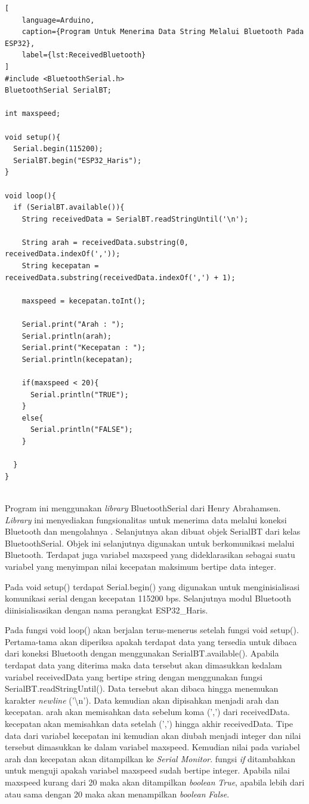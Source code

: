 \begin{lstlisting}[
    language=Arduino,
    caption={Program Untuk Menerima Data String Melalui Bluetooth Pada ESP32},
    label={lst:ReceivedBluetooth}
]
#include <BluetoothSerial.h>
BluetoothSerial SerialBT;

int maxspeed;

void setup(){
  Serial.begin(115200);
  SerialBT.begin("ESP32_Haris");
}

void loop(){
  if (SerialBT.available()){
    String receivedData = SerialBT.readStringUntil('\n');

    String arah = receivedData.substring(0, receivedData.indexOf(','));
    String kecepatan = receivedData.substring(receivedData.indexOf(',') + 1);

    maxspeed = kecepatan.toInt();

    Serial.print("Arah : ");
    Serial.println(arah);
    Serial.print("Kecepatan : ");
    Serial.println(kecepatan);

    if(maxspeed < 20){
      Serial.println("TRUE");
    }
    else{
      Serial.println("FALSE");
    }

  }
}
    
\end{lstlisting}

Program ini menggunakan \emph{library} BluetoothSerial dari Henry Abrahamsen. \emph{Library} ini menyediakan fungsionalitas untuk menerima data melalui koneksi Bluetooth dan mengolahnya \parencite{Abrahamsen_2023}. Selanjutnya akan dibuat objek SerialBT dari kelas BluetoothSerial. Objek ini selanjutnya digunakan untuk berkomunikasi melalui Bluetooth. Terdapat juga variabel maxspeed yang dideklarasikan sebagai suatu variabel yang menyimpan nilai kecepatan maksimum bertipe data integer.

Pada void setup() terdapat Serial.begin() yang digunakan untuk menginisialisasi komunikasi serial dengan kecepatan 115200 bps. Selanjutnya modul Bluetooth diinisialisasikan dengan nama perangkat ESP32\_Haris.

Pada fungsi void loop() akan berjalan terus-menerus setelah fungsi void setup(). Pertama-tama akan diperiksa apakah terdapat data yang tersedia untuk dibaca dari koneksi Bluetooth dengan menggunakan SerialBT.available(). Apabila terdapat data yang diterima maka data tersebut akan dimasukkan kedalam variabel receivedData yang bertipe string dengan menggunakan fungsi SerialBT.readStringUntil(). Data tersebut akan dibaca hingga menemukan karakter \emph{newline} ('\textbackslash n'). Data kemudian akan dipisahkan menjadi arah dan kecepatan. arah akan memisahkan data sebelum koma (',') dari receivedData. kecepatan akan memisahkan data setelah (',') hingga akhir receivedData. Tipe data dari variabel kecepatan ini kemudian akan diubah menjadi integer dan nilai tersebut dimasukkan ke dalam variabel maxspeed. Kemudian nilai pada variabel arah dan kecepatan akan ditampilkan ke \emph{Serial Monitor}. fungsi \emph{if} ditambahkan untuk menguji apakah variabel maxspeed sudah bertipe integer. Apabila nilai maxspeed kurang dari 20 maka akan ditampilkan \emph{boolean} \emph{True}, apabila lebih dari atau sama dengan 20 maka akan menampilkan \emph{boolean} \emph{False}.

